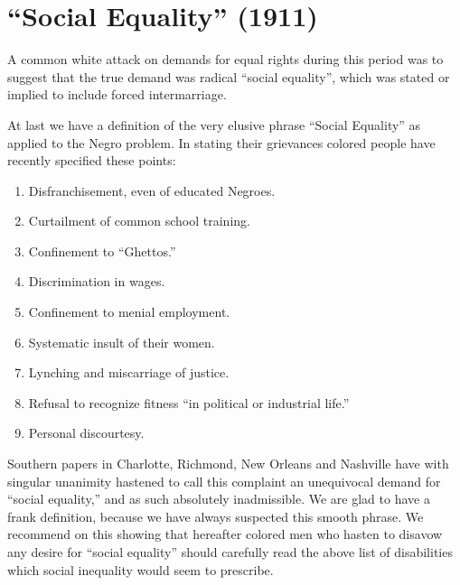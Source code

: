 \documentclass[letterpaper,10pt,english]{jupyterBook}
\begin{document}
\section{“Social Equality” (1911)}
\label{\detokenize{Volumes/01/03/social_equality:social-equality-1911}}\label{\detokenize{Volumes/01/03/social_equality::doc}}
\begin{sphinxShadowBox}
\sphinxstylesidebartitle{}

\sphinxAtStartPar
A common white attack on demands for equal rights during this period was to suggest that the true demand was radical “social equality”, which was stated or implied to include forced intermarriage.
\end{sphinxShadowBox}

\sphinxAtStartPar
At last we have a definition of the very elusive phrase “Social Equality” as applied to the Negro problem. In stating their grievances colored people have recently specified these points:
\begin{enumerate}
%
\item {} 
\sphinxAtStartPar
Disfranchisement, even of educated Negroes.

\item {} 
\sphinxAtStartPar
Curtailment of common school training.

\item {} 
\sphinxAtStartPar
Confinement to “Ghettos.”

\item {} 
\sphinxAtStartPar
Discrimination in wages.

\item {} 
\sphinxAtStartPar
Confinement to menial employment.

\item {} 
\sphinxAtStartPar
Systematic insult of their women.

\item {} 
\sphinxAtStartPar
Lynching and miscarriage of justice.

\item {} 
\sphinxAtStartPar
Refusal to recognize fitness “in political or industrial life.”

\item {} 
\sphinxAtStartPar
Personal discourtesy.

\end{enumerate}

\sphinxAtStartPar
Southern papers in Charlotte, Richmond, New Orleans and Nashville have with singular unanimity hastened to call this complaint an unequivocal demand for “social equality,” and as such absolutely inadmissible. We are glad to have a frank definition, because we have always suspected this smooth phrase. We recommend on this showing that hereafter colored men who hasten to disavow any desire for “social equality” should carefully read the above list of disabilities which social inequality would seem to prescribe.
\end{document}
